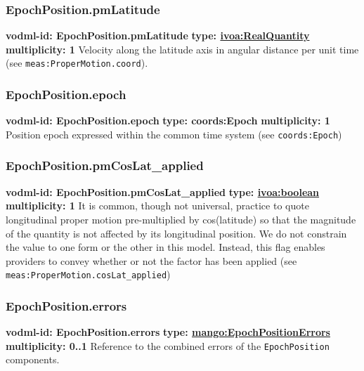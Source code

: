     \subsubsection{EpochPosition.pmLatitude}
      \textbf{vodml-id: EpochPosition.pmLatitude} \newline
      \textbf{type: \hyperref[sect:ivoa]{ivoa:RealQuantity}} \newline
      \textbf{multiplicity: 1} \newline
      Velocity along the latitude axis in angular distance per unit time (see \texttt{meas:ProperMotion.coord}).

    \subsubsection{EpochPosition.epoch}
      \textbf{vodml-id: EpochPosition.epoch} \newline
      \textbf{type: coords:Epoch} \newline
      \textbf{multiplicity: 1} \newline
      Position epoch expressed within the common time system (see \texttt{coords:Epoch})

    \subsubsection{EpochPosition.pmCosLat\_applied}
      \textbf{vodml-id: EpochPosition.pmCosLat\_applied} \newline
      \textbf{type: \hyperref[sect:ivoa]{ivoa:boolean}} \newline
      \textbf{multiplicity: 1} \newline
      It is common, though not universal, practice to quote longitudinal proper motion pre-multiplied by cos(latitude) so that the magnitude of the quantity is not affected by its longitudinal position. We do not constrain the value to one form or the other in this model. Instead, this flag enables providers to convey whether or not the factor has been applied (see \texttt{meas:ProperMotion.cosLat\_applied})

    \subsubsection{EpochPosition.errors}
      \textbf{vodml-id: EpochPosition.errors} \newline
      \textbf{type: \hyperref[sect:EpochPositionErrors]{mango:EpochPositionErrors}} \newline
      \textbf{multiplicity: 0..1} \newline
      Reference to the combined errors of the \texttt{EpochPosition} components.

